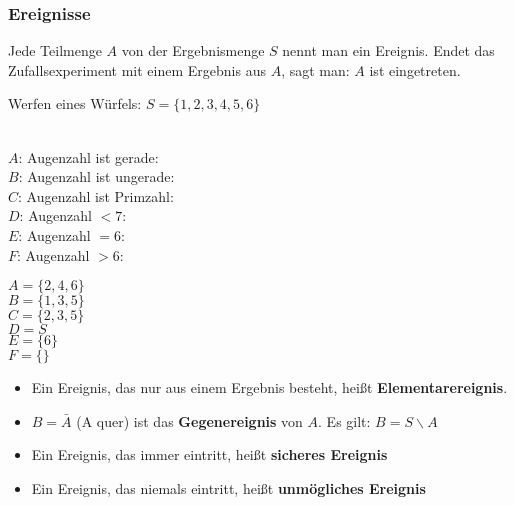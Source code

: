 \documentclass[main.tex]{subfiles}
\begin{document}
\subsubsection{Ereignisse}
\begin{Definition}[Ereignisse]
  Jede Teilmenge $A$ von der Ergebnismenge $S$ nennt man ein Ereignis. Endet das Zufallsexperiment mit einem Ergebnis aus $A$, sagt man: $A$ ist eingetreten.
\end{Definition}
\begin{Beispiel}
  Werfen eines Würfels: $S = \{ 1,2,3,4,5,6 \}$\\\\
  \begin{minipage}{0.4\textwidth}
    $A$: Augenzahl ist gerade:\\
    $B$: Augenzahl ist ungerade:\\
    $C$: Augenzahl ist Primzahl:\\
    $D$: Augenzahl $<7$:\\
    $E$: Augenzahl $=6$:\\
    $F$: Augenzahl $>6$:\\
  \end{minipage}
  \begin{minipage}{0.6\textwidth}
    $A = \{ 2,4,6 \}$\\
    $B = \{ 1,3,5 \}$\\
    $C = \{ 2,3,5 \}$\\
    $D =S$\\
    $E = \{ 6 \}$\\
    $F = \{ \}$
  \end{minipage}
\end{Beispiel}
\begin{Bemerkung}
  \begin{Definition}
    \begin{itemize}
      \item Ein Ereignis, das nur aus einem Ergebnis besteht, heißt \textbf{Elementarereignis}.
      \item $B=\bar A$ (A quer) ist das \textbf{Gegenereignis} von $A$. Es gilt: $B = S \backslash A$
      \item Ein Ereignis, das immer eintritt, heißt \textbf{sicheres Ereignis}
      \item Ein Ereignis, das niemals eintritt, heißt \textbf{unmögliches Ereignis}
    \end{itemize}
  \end{Definition}
\end{Bemerkung}
\end{document}
